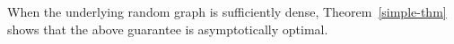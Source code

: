 When the underlying random graph is sufficiently dense, Theorem~\ref{simple-thm} shows that the above guarantee is asymptotically optimal. \vs
%
%
%
%
%
%

